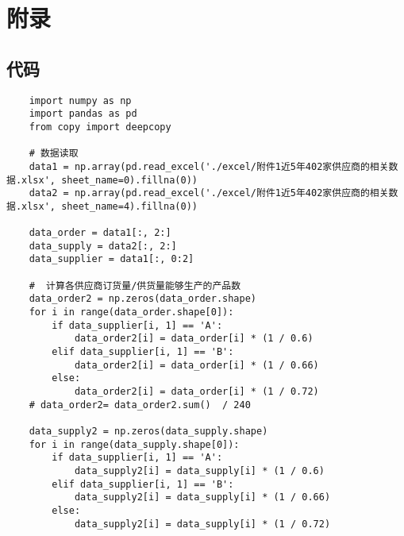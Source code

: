 \documentclass[UTF8]{ctexart}
\begin{document}
\clearpage

\clearpage

\section{附录}
\subsection{代码}

\lstset{language=python}
\begin{lstlisting}
	import numpy as np
	import pandas as pd
	from copy import deepcopy
	
	# 数据读取
	data1 = np.array(pd.read_excel('./excel/附件1近5年402家供应商的相关数据.xlsx', sheet_name=0).fillna(0))
	data2 = np.array(pd.read_excel('./excel/附件1近5年402家供应商的相关数据.xlsx', sheet_name=4).fillna(0))
	
	data_order = data1[:, 2:]
	data_supply = data2[:, 2:]
	data_supplier = data1[:, 0:2]
	
	#  计算各供应商订货量/供货量能够生产的产品数
	data_order2 = np.zeros(data_order.shape)
	for i in range(data_order.shape[0]):
		if data_supplier[i, 1] == 'A':
			data_order2[i] = data_order[i] * (1 / 0.6)
		elif data_supplier[i, 1] == 'B':
			data_order2[i] = data_order[i] * (1 / 0.66)
		else:
			data_order2[i] = data_order[i] * (1 / 0.72)
	# data_order2= data_order2.sum()  / 240
	
	data_supply2 = np.zeros(data_supply.shape)
	for i in range(data_supply.shape[0]):
		if data_supplier[i, 1] == 'A':
			data_supply2[i] = data_supply[i] * (1 / 0.6)
		elif data_supplier[i, 1] == 'B':
			data_supply2[i] = data_supply[i] * (1 / 0.66)
		else:
			data_supply2[i] = data_supply[i] * (1 / 0.72)
	

\end{lstlisting}
\end{document}
